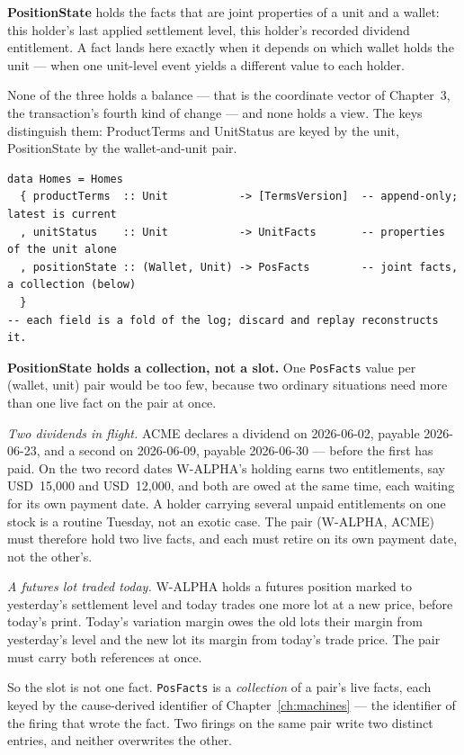 \documentclass[11pt,a4paper]{article}
\newcommand{\USD}[1]{\mbox{USD~#1}}
\begin{document}
\textbf{PositionState} holds the facts that are joint properties of a unit and a wallet:
this holder's last applied settlement level, this holder's recorded dividend entitlement.
A fact lands here exactly when it depends on which wallet holds the unit --- when one
unit-level event yields a different value to each holder.

None of the three holds a balance --- that is the coordinate vector of
Chapter~3, the transaction's fourth kind of change --- and none holds a
view. The keys distinguish them: ProductTerms and UnitStatus are keyed by the unit,
PositionState by the wallet-and-unit pair.

\begin{lstlisting}
data Homes = Homes
  { productTerms  :: Unit           -> [TermsVersion]  -- append-only; latest is current
  , unitStatus    :: Unit           -> UnitFacts       -- properties of the unit alone
  , positionState :: (Wallet, Unit) -> PosFacts        -- joint facts, a collection (below)
  }
-- each field is a fold of the log; discard and replay reconstructs it.
\end{lstlisting}

\medskip\noindent\textbf{PositionState holds a collection, not a slot.} One
\texttt{PosFacts} value per (wallet, unit) pair would be too few, because two ordinary
situations need more than one live fact on the pair at once.

\emph{Two dividends in flight.} ACME declares a dividend on 2026-06-02, payable 2026-06-23,
and a second on 2026-06-09, payable 2026-06-30 --- before the first has paid. On the two
record dates W-ALPHA's holding earns two entitlements, say \USD{15{,}000} and \USD{12{,}000},
and both are owed at the same time, each waiting for its own payment date. A holder carrying
several unpaid entitlements on one stock is a routine Tuesday, not an exotic case. The pair
(W-ALPHA, ACME) must therefore hold two live facts, and each must retire on its own payment
date, not the other's.

\emph{A futures lot traded today.} W-ALPHA holds a futures position marked to yesterday's
settlement level and today trades one more lot at a new price, before today's print. Today's
variation margin owes the old lots their margin from yesterday's level and the new lot its
margin from today's trade price. The pair must carry both references at once.

So the slot is not one fact. \texttt{PosFacts} is a \emph{collection} of a pair's live facts,
each keyed by the cause-derived identifier of Chapter~\ref{ch:machines} --- the identifier of
the firing that wrote the fact. Two firings on the same pair write two distinct entries, and
neither overwrites the other.
\end{document}
